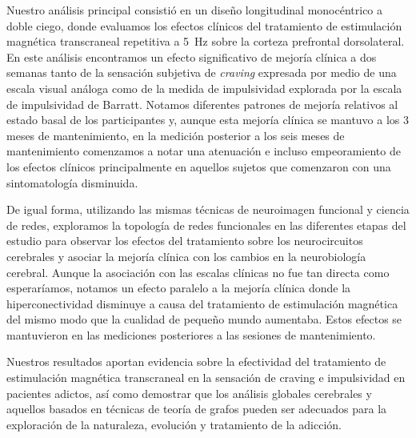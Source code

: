 Nuestro análisis principal consistió en un diseño longitudinal monocéntrico a doble ciego, donde evaluamos los efectos clínicos del tratamiento de estimulación magnética transcraneal repetitiva a \SI{5}{\hertz} sobre la corteza prefrontal dorsolateral.
En este análisis encontramos un efecto significativo de mejoría clínica a dos semanas tanto de la sensación subjetiva de \textit{craving} expresada por medio de una escala visual análoga como de la medida de impulsividad explorada por la escala de impulsividad de Barratt. Notamos diferentes patrones de mejoría relativos al estado basal de los participantes y, aunque esta mejoría clínica se mantuvo a los 3 meses de mantenimiento, en la medición posterior a los seis meses de mantenimiento comenzamos a notar una atenuación e incluso empeoramiento de los efectos clínicos principalmente en aquellos sujetos que comenzaron con una sintomatología disminuida.\par
De igual forma, utilizando las mismas técnicas de neuroimagen funcional y ciencia de redes, exploramos la topología de redes funcionales en las diferentes etapas del estudio para observar los efectos del tratamiento sobre los neurocircuitos cerebrales y asociar la mejoría clínica con los cambios en la neurobiología cerebral. Aunque la asociación con las escalas clínicas no fue tan directa como esperaríamos, notamos un efecto paralelo a la mejoría clínica donde la hiperconectividad disminuye a causa del tratamiento de estimulación magnética del mismo modo que la cualidad de pequeño mundo aumentaba. Estos efectos se mantuvieron en las mediciones posteriores a las sesiones de mantenimiento.\par
Nuestros resultados aportan evidencia sobre la efectividad del tratamiento de estimulación magnética transcraneal en la sensación de craving e impulsividad en pacientes adictos, así como demostrar que los análisis globales cerebrales y aquellos basados en técnicas de teoría de grafos pueden ser adecuados para la exploración de la naturaleza, evolución y tratamiento de la adicción.
